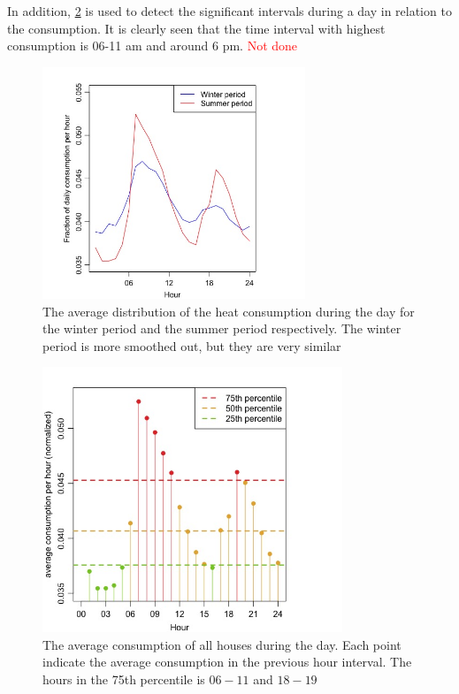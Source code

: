 In addition, \cref{fig:HourDistribution} is used to detect the significant intervals during a day in relation to the consumption. It is clearly seen that the time interval with highest consumption is 06-11 am and around 6 pm. \textcolor{red}{Not done}

\begin{figure}
    \centering
    \includegraphics[width=0.7\textwidth]{../../../figures/Season_distribution.jpeg}
    \caption{The average distribution of the heat consumption during the day for the winter period and the summer period respectively. The winter period is more smoothed out, but they are very similar}
    \label{fig: Season_dist}
\end{figure}

\begin{figure}
    \centering
    \includegraphics[width=0.8\textwidth]{../../../figures/HourDistribution.jpeg}
    \caption{The average consumption of all houses during the day. Each point indicate the average consumption in the previous hour interval. The hours in the 75th percentile is $06-11$ and $18-19$}
    \label{fig:HourDistribution}
\end{figure}


